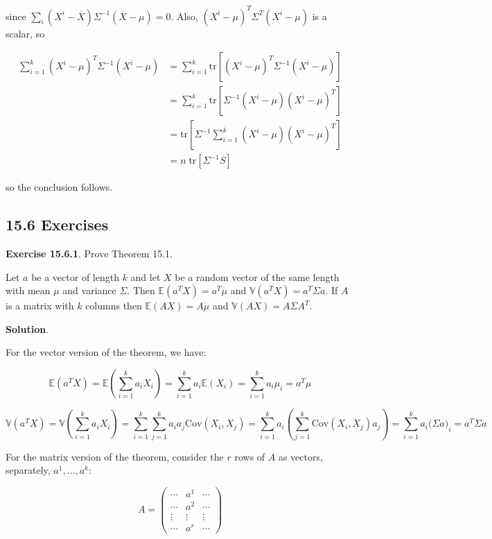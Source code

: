 since
\(\sum_i (X^i - \overline{X}) \Sigma^{-1} (\overline{X} - \mu) = 0\).
Also, \((X^i - \mu)^T \Sigma^T (X^i - \mu)\) is a scalar, so

\begin{align}
\sum_{i=1}^k (X^i - \mu)^T \Sigma^{-1} (X^i - \mu) &=
\sum_{i=1}^k \text{tr} \left[ (X^i - \mu)^T \Sigma^{-1} (X^i - \mu)\right] \\
&= \sum_{i=1}^k \text{tr} \left[ \Sigma^{-1} (X^i - \mu) (X^i - \mu)^T \right] \\
&= \text{tr} \left[ \Sigma^{-1} \sum_{i=1}^k (X^i - \mu) (X^i - \mu) ^T \right] \\
&= n \; \text{tr} \left[ \Sigma^{-1} S\right]
\end{align}

so the conclusion follows.

\subsection{15.6 Exercises}\label{exercises}

\textbf{Exercise 15.6.1}. Prove Theorem 15.1.

Let \(a\) be a vector of length \(k\) and let \(X\) be a random vector
of the same length with mean \(\mu\) and variance \(\Sigma\). Then
\(\mathbb{E}(a^T X) = a^T\mu\) and \(\mathbb{V}(a^T X) = a^T \Sigma a\).
If \(A\) is a matrix with \(k\) columns then \(\mathbb{E}(AX) = A\mu\)
and \(\mathbb{V}(AX) = A \Sigma A^T\).

\textbf{Solution}.

For the vector version of the theorem, we have:

\[\mathbb{E}(a^T X) = \mathbb{E}\left( \sum_{i=1}^k a_i X_i \right) = \sum_{i=1}^k a_i \mathbb{E}(X_i) = \sum_{i=1}^k a_i \mu_i = a^T \mu \]

\[\mathbb{V}(a^T X) = \mathbb{V}\left( \sum_{i=1}^k a_i X_i \right) = \sum_{i=1}^k \sum_{j=1}^k a_i a_j \text{Cov} (X_i, X_j) = \sum_{i=1}^k a_i \left( \sum_{j=1}^k \text{Cov}(X_i, X_j) a_j \right) = \sum_{i=1}^k a_i \Big( \Sigma a \Big)_i = a^T \Sigma a\]

For the matrix version of the theorem, consider the \(r\) rows of \(A\)
as vectors, separately, \(a^1, \dots, a^k\):

\[ A = \begin{pmatrix}
\cdots & a^1 & \cdots \\
\cdots & a^2 & \cdots \\
\vdots & \vdots & \vdots \\
\cdots & a^r & \cdots
\end{pmatrix}\]

